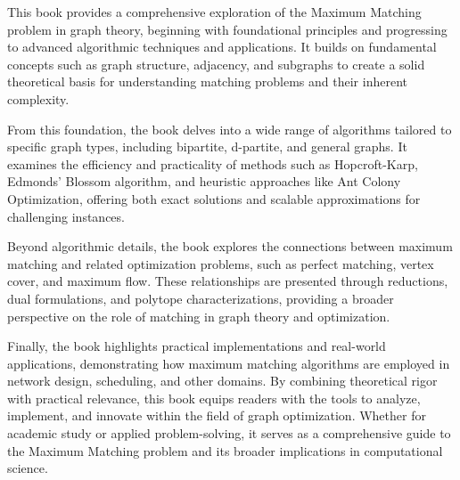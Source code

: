 
\noindent This book provides a comprehensive exploration of the Maximum Matching problem in graph theory, beginning with foundational principles and progressing to advanced algorithmic techniques and applications. It builds on fundamental concepts such as graph structure, adjacency, and subgraphs to create a solid theoretical basis for understanding matching problems and their inherent complexity.

\noindent From this foundation, the book delves into a wide range of algorithms tailored to specific graph types, including bipartite, d-partite, and general graphs. It examines the efficiency and practicality of methods such as Hopcroft-Karp, Edmonds' Blossom algorithm, and heuristic approaches like Ant Colony Optimization, offering both exact solutions and scalable approximations for challenging instances.

\noindent Beyond algorithmic details, the book explores the connections between maximum matching and related optimization problems, such as perfect matching, vertex cover, and maximum flow. These relationships are presented through reductions, dual formulations, and polytope characterizations, providing a broader perspective on the role of matching in graph theory and optimization.

\noindent Finally, the book highlights practical implementations and real-world applications, demonstrating how maximum matching algorithms are employed in network design, scheduling, and other domains. By combining theoretical rigor with practical relevance, this book equips readers with the tools to analyze, implement, and innovate within the field of graph optimization. Whether for academic study or applied problem-solving, it serves as a comprehensive guide to the Maximum Matching problem and its broader implications in computational science.